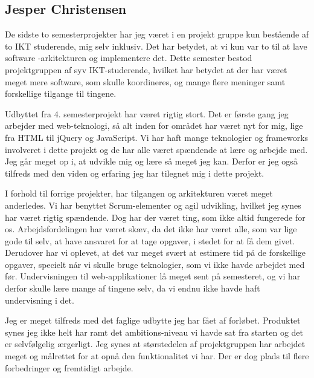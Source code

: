 \subsection*{Jesper Christensen}

De sidste to semesterprojekter har jeg været i en projekt gruppe kun bestående af to IKT studerende, mig selv inklusiv. Det har betydet, at vi kun var to til at lave software 
-arkitekturen og implementere det. Dette semester bestod projektgruppen af syv IKT-studerende, hvilket har betydet at der har været meget mere software, som skulle koordineres, og mange flere meninger samt forskellige tilgange til tingene. 

Udbyttet fra 4. semesterprojekt har været rigtig stort. Det er første gang jeg arbejder med web-teknologi, så alt inden for området har været nyt for mig, lige fra HTML til jQuery og JavaScript. Vi har haft mange teknologier og frameworks involveret i dette projekt og de har alle været spændende at lære og arbejde med. Jeg går meget op i, at udvikle mig og lære så meget jeg kan. Derfor er jeg også tilfreds med den viden og erfaring jeg har tilegnet mig i dette projekt.

I forhold til forrige projekter, har tilgangen og arkitekturen været meget anderledes. Vi har benyttet Scrum-elementer og agil udvikling, hvilket jeg synes har været rigtig spændende. Dog har der været ting, som ikke altid fungerede for os. Arbejdsfordelingen har været skæv, da det ikke har været alle, som var lige gode til selv, at have ansvaret for at tage opgaver, i stedet for at få dem givet. Derudover har vi oplevet, at det var meget svært at estimere tid på de forskellige opgaver, specielt når vi skulle bruge teknologier, som vi ikke havde arbejdet med før. Undervisningen til web-applikationer lå meget sent på semesteret, og vi har derfor skulle lære mange af tingene selv, da vi endnu ikke havde haft undervisning i det.

Jeg er meget tilfreds med det faglige udbytte jeg har fået af forløbet. Produktet synes jeg ikke helt har ramt det ambitions-niveau vi havde sat fra starten og det er selvfølgelig ærgerligt. Jeg synes at størstedelen af projektgruppen har arbejdet meget og målrettet for at opnå den funktionalitet vi har. Der er dog plads til flere forbedringer og fremtidigt arbejde.